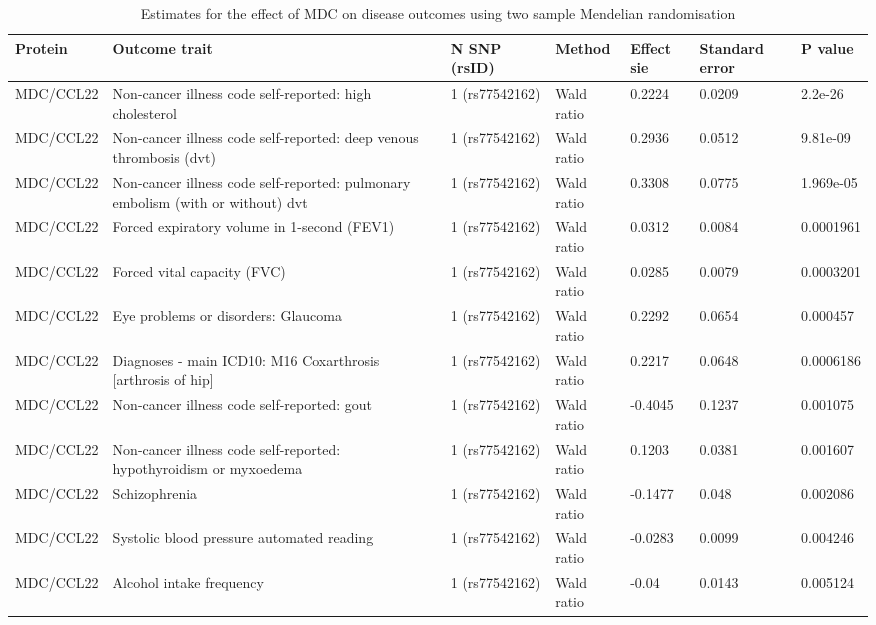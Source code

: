 \documentclass[11pt,twoside]{bristolthesis}
\begin{document}
\begin{landscape}\begin{table}

\caption{\label{tab:MDC-disease-MR}Estimates for the effect of MDC on disease outcomes using two sample Mendelian randomisation}
\centering
\fontsize{9}{11}\selectfont
\begin{tabu} to 
\toprule
Protein & Outcome trait & N SNP (rsID) & Method & Effect sie & Standard error & P value\\
\midrule
MDC/CCL22 & Non-cancer illness code self-reported: high cholesterol & 1 (rs77542162) & Wald ratio & 0.2224 & 0.0209 & 2.2e-26\\
MDC/CCL22 & Non-cancer illness code self-reported: deep venous thrombosis (dvt) & 1 (rs77542162) & Wald ratio & 0.2936 & 0.0512 & 9.81e-09\\
MDC/CCL22 & Non-cancer illness code self-reported: pulmonary embolism (with or without) dvt & 1 (rs77542162) & Wald ratio & 0.3308 & 0.0775 & 1.969e-05\\
MDC/CCL22 & Forced expiratory volume in 1-second (FEV1) & 1 (rs77542162) & Wald ratio & 0.0312 & 0.0084 & 0.0001961\\
MDC/CCL22 & Forced vital capacity (FVC) & 1 (rs77542162) & Wald ratio & 0.0285 & 0.0079 & 0.0003201\\
\addlinespace
MDC/CCL22 & Eye problems or disorders: Glaucoma & 1 (rs77542162) & Wald ratio & 0.2292 & 0.0654 & 0.000457\\
MDC/CCL22 & Diagnoses - main ICD10: M16 Coxarthrosis [arthrosis of hip] & 1 (rs77542162) & Wald ratio & 0.2217 & 0.0648 & 0.0006186\\
MDC/CCL22 & Non-cancer illness code self-reported: gout & 1 (rs77542162) & Wald ratio & -0.4045 & 0.1237 & 0.001075\\
MDC/CCL22 & Non-cancer illness code self-reported: hypothyroidism or myxoedema & 1 (rs77542162) & Wald ratio & 0.1203 & 0.0381 & 0.001607\\
MDC/CCL22 & Schizophrenia & 1 (rs77542162) & Wald ratio & -0.1477 & 0.048 & 0.002086\\
\addlinespace
MDC/CCL22 & Systolic blood pressure automated reading & 1 (rs77542162) & Wald ratio & -0.0283 & 0.0099 & 0.004246\\
MDC/CCL22 & Alcohol intake frequency & 1 (rs77542162) & Wald ratio & -0.04 & 0.0143 & 0.005124\\

\end{tabu}
\end{table}
\end{landscape}
\end{document}
